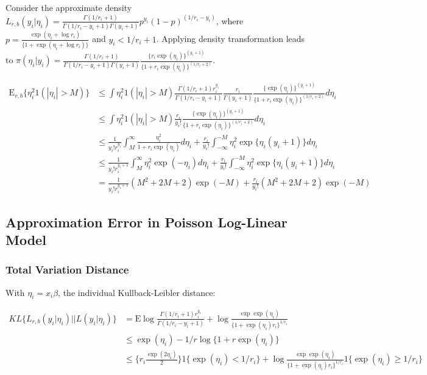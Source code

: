 \documentclass[10pt]{article}
\newcommand{\xbeta}{ x_i \beta}
\begin{document}
Consider the approximate density $L_{r,b} (y_i| \eta_i) =\frac{\Gamma(1/r_i+1)}{\Gamma(1/r_i-y_i+1)\Gamma(y_i+1)} p^{y_i} (1-p)^{(1/r_i-y_i)}$, where $p=\frac{\exp ( \eta_i+\log r_i)}{\{1+ \exp ( \eta_i +\log r_i)\}}$ and $y_i< 1/r_i+1$.  Applying density transformation leads to $\pi(\eta_{i}|y_i) = \frac{\Gamma(1/r_i+1)}{\Gamma(1/r_i-y_i+1)\Gamma(y_i+1)}\frac{\{r_i\exp(\eta_{i})\}^{(y_i+1)}}{\{1+r_i\exp(\eta_{i})\}^{(1/r_i+2)}}$.

\begin{equation}
	\begin{aligned}
			\mbox{E}_{r,b}\{ \eta_{i}^2 1(|\eta_{i}|>M) \}  %
	&	 \le      \int      \eta_i^2  1(|\eta_{i}|>M)  \frac{\Gamma(1/r_i+1)r_i^{y_i}}{\Gamma(1/r_i-y_i+1)}\frac{r_i}{\Gamma(y_i+1)}\frac{\{\exp(\eta_{i})\}^{(y_i+1)}}{\{1+r_i\exp(\eta_{i})\}^{(1/r_i+2)}} d\eta_i  \\
	&  \le \int \eta_i^2  1(|\eta_{i}|>M) \frac{r_i}{y_i!}\frac{\{\exp(\eta_{i})\}^{(y_i+1)}}{\{1+r_i\exp(\eta_{i})\}^{(1/r_i+2)}} d\eta_i  \\	
		& \le \frac{1}{y_i! r_i^{y_i}} \int_M^{\infty} \frac{\eta_{i}^2}{1+r_i\exp(\eta_{i})} d\eta_{i} +  \frac{r_i}{y_i!} \int_{-\infty}^{-M}{\eta_{i}^2}{\exp\{\eta_{i} (y_i+1) \}}d\eta_{i} \\
		& \le \frac{1}{y_i! r_i^{y_i+1}} \int_M^{\infty} {\eta_{i}^2}{\exp(-\eta_{i})} d\eta_{i} +  \frac{r_i}{y_i!} \int_{-\infty}^{-M}{\eta_{i}^2}{\exp\{\eta_{i} (y_i+1) \}}d\eta_{i} \\
	& = \frac{1}{y_i! r_i^{y_i+1}} (M^2+2M+2)\exp(-M) + \frac{r_i}{y_i!}   (M^2+2M+2)\exp(-M) 
	\end{aligned}
\end{equation}

\subsection{Approximation Error in Poisson Log-Linear Model}

\subsubsection{Total Variation Distance}

With $\eta_i=\xbeta$, the individual Kullback-Leibler distance:

\begin{equation}
\begin{aligned}
KL\{ { L_{r,b}(y_i|\eta_{i}) } || {L(y_i|\eta_{i})} \}& =\mbox{E}\log \frac{\Gamma(1/r_i+1) r_i^{y_i}  }{\Gamma(1/r_i -y_i+1)   } + \log \frac{ \exp\exp(\eta_{i})}{ \{1+\exp(\eta_{i})r_i\}^{1/r_i}}\\
& \le \exp ( \eta_{i})   - 1/r \log\{1+ r\exp ( \eta_{i})\}\\
& \le   \{   r_i \frac{ \exp(2\eta_{i})}{2} \}  1\{\exp(\eta_{i})< 1/r_i\} + \log \frac{ \exp\exp(\eta_{i})}{ \{1+\exp(\eta_{i})r_i\}^{1/r_i}} 1\{\exp(\eta_{i})\ge 1/r_i\} \\
\label{KL_poisson}
\end{aligned}
\end{equation}
\end{document}
